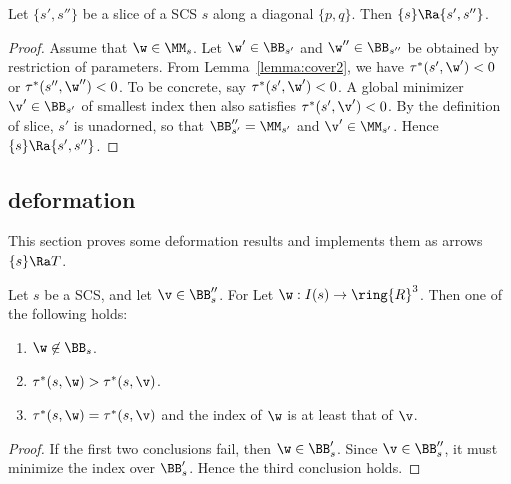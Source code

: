 \begin{lemma}[slice]  Let $\{s',s''\}$ be a slice of
a SCS $s$ along
a diagonal $\{p,q\}$.  
Then   $\{s\}\Ra\{s',s''\}$.
\end{lemma}

\begin{proof}
Assume that $\w\in\MM_s$.
Let $\w'\in \BB_{s'}$ and $\w''\in \BB_{s''}$ be obtained
by restriction of parameters.  From Lemma~\ref{lemma:cover2},
we have $\tau^*(s',\w')< 0$ or $\tau^*(s'',\w'')<0$.  To be
concrete, say $\tau^*(s',\w')< 0$.  A global minimizer $\v'\in\BB_{s'}$ of smallest index
then also satisfies $\tau^*(s',\v')< 0$.  By the definition of
slice, $s'$ is unadorned, so that $\BB''_{s'}=\MM_{s'}$ and
$\v'\in \MM_{s'}$.  Hence $\{s\}\Ra\{s',s''\}$.
\end{proof}


\subsection{deformation}

This section proves some deformation results and implements them
as arrows $\{s\}\Ra T$.

\begin{lemma} 
Let $s$ be a SCS, and let $\v\in\BB''_s$.  For
Let $\w:I(s)\to\ring{R}^3$.
Then  one of the following holds:
\begin{enumerate}
\item $\w\not\in \BB_s$.
\item $\tau^*(s,\w)> \tau^*(s,\v)$.
\item $\tau^*(s,\w)=\tau^*(s,\v)$ and the index of $\w$ is at least that of $\v$.
\end{enumerate}
\end{lemma}

\begin{proof}
If the first two conclusions fail, then $\w\in \BB'_s$.  Since $\v\in\BB''_s$,
it must minimize the index over $\BB'_s$.  Hence the third conclusion holds.
\end{proof}


